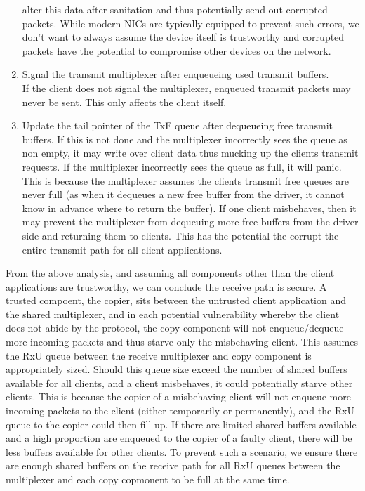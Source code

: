 \begin{enumerate}
    alter this data after sanitation and thus potentially send out corrupted packets. While modern NICs are typically equipped to prevent
    such errors, we don't want to always assume the device itself is trustworthy and corrupted packets have the potential to compromise
    other devices on the network.
    \item Signal the transmit multiplexer after enqueueing used transmit buffers.\\
    If the client does not signal the multiplexer, enqueued transmit packets may never be sent. This only affects the client itself.
    \item Update the tail pointer of the TxF queue after dequeueing free transmit buffers. If this is not done and the multiplexer
        incorrectly sees the queue as non empty, it may write over client data thus mucking up the clients transmit requests. If
        the multiplexer incorrectly sees the queue as full, it will panic. This is because the multiplexer assumes the clients 
        transmit free queues are never full (as when it dequeues a new free buffer from the driver, it cannot know in advance where 
        to return the buffer). If one client misbehaves, then it may prevent the multiplexer from dequeuing more free buffers 
        from the driver side and returning them to clients. This has the potential the corrupt the entire transmit path for all
        client applications.
\end{enumerate}

From the above analysis, and assuming all components other than the client applications are trustworthy,
we can conclude the receive path is secure. A trusted compoent, the copier, sits between the untrusted client application
and the shared multiplexer, and in each potential vulnerability whereby the client does not abide by the protocol, the copy component
will not enqueue/dequeue more incoming packets and thus starve only the misbehaving client. This assumes the RxU queue between 
the receive multiplexer and copy component is appropriately sized. Should this queue size exceed the number of shared buffers
available for all clients, and a client misbehaves, it could potentially starve other clients. This is because the copier
of a misbehaving client will not enqueue more incoming packets to the client (either temporarily or permanently), and the RxU queue
to the copier could then fill up. If there are limited shared buffers available and a high proportion are enqueued to the copier
of a faulty client, there will be less buffers available for other clients. To prevent such a scenario, we ensure there are enough
shared buffers on the receive path for all RxU queues between the multiplexer and each copy copmonent to be full at the same time.\\

